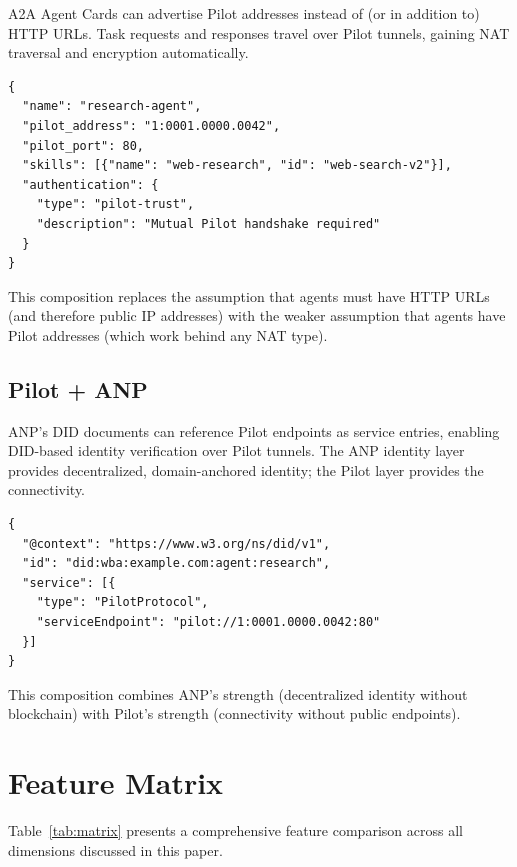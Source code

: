 \documentclass[11pt,a4paper]{article}
\begin{document}
A2A Agent Cards can advertise Pilot addresses instead of (or in addition to) HTTP URLs. Task requests and responses travel over Pilot tunnels, gaining NAT traversal and encryption automatically.

\begin{lstlisting}[language={},keywords={}]
{
  "name": "research-agent",
  "pilot_address": "1:0001.0000.0042",
  "pilot_port": 80,
  "skills": [{"name": "web-research", "id": "web-search-v2"}],
  "authentication": {
    "type": "pilot-trust",
    "description": "Mutual Pilot handshake required"
  }
}
\end{lstlisting}

This composition replaces the assumption that agents must have HTTP URLs (and therefore public IP addresses) with the weaker assumption that agents have Pilot addresses (which work behind any NAT type).

\subsection{Pilot + ANP}

ANP's DID documents can reference Pilot endpoints as service entries, enabling DID-based identity verification over Pilot tunnels. The ANP identity layer provides decentralized, domain-anchored identity; the Pilot layer provides the connectivity.

\begin{lstlisting}[language={},keywords={}]
{
  "@context": "https://www.w3.org/ns/did/v1",
  "id": "did:wba:example.com:agent:research",
  "service": [{
    "type": "PilotProtocol",
    "serviceEndpoint": "pilot://1:0001.0000.0042:80"
  }]
}
\end{lstlisting}

This composition combines ANP's strength (decentralized identity without blockchain) with Pilot's strength (connectivity without public endpoints).

\section{Feature Matrix}

Table~\ref{tab:matrix} presents a comprehensive feature comparison across all dimensions discussed in this paper.
\end{document}
